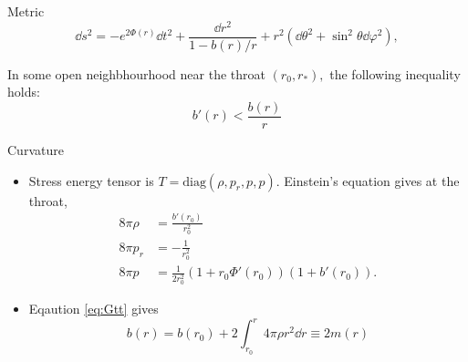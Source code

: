 \documentclass[aspectratio=169,xcolor=dvipsnames]{beamer}
\begin{document}
\begin{frame}{Metric}
    \begin{equation*}
        \dd{s}^2 = -e^{2\Phi(r)}\dd{t}^2 + \frac{\dd{r}^2}{1-b(r)/r} + r^2\left(\dd{\theta}^2 + \sin^2\theta\dd{\varphi}^2\right),
    \end{equation*}
    \begin{proposition}
        In some open neighbhourhood near the throat $(r_0,r_*),$ the following inequality holds:
        \begin{equation}
            b'(r) < \frac{b(r)}{r}
        \end{equation}
    \end{proposition}
\end{frame}

\begin{frame}{Curvature}
    \begin{itemize}
        \item Stress energy tensor is $T=\text{diag}(\rho,p_r,p,p).$ Einstein's equation gives at the throat,
        \begin{align}
            8\pi \rho &= \frac{b'(r_0)}{r_0^2} \label{eq:Gtt}\\ 
            8\pi p_r &= -\frac{1}{r_0^2} \\ 
            8\pi p &= \frac{1}{2r_0^2}(1+r_0\Phi'(r_0))(1+b'(r_0)).
        \end{align}
        \item Eqaution \ref{eq:Gtt} gives 
        \begin{equation}
            b(r) = b(r_0) + 2\int_{r_0}^{r}4\pi \rho r^2\dd{r} \equiv 2m(r)
        \end{equation}
    \end{itemize}
\end{frame}
\end{document}
